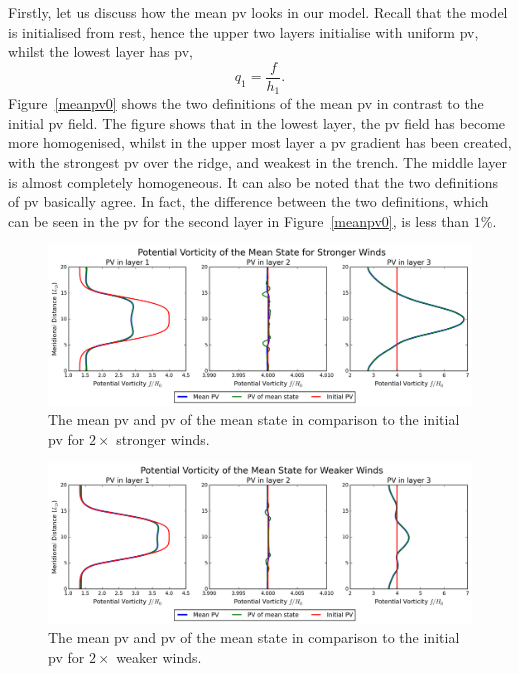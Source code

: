 \documentclass[12pt,a4paper]{report}
\newcommand*\figref[1]{Figure~\ref{#1}}
\begin{document}
 Firstly, let us discuss how the mean \gls{pv} looks in our model. Recall that the model
 is initialised from rest, hence the upper two layers initialise with uniform \gls{pv},
 whilst the lowest layer has \gls{pv},
 \begin{equation*}
 q_{1}=\frac{f}{h_{1}}.
 \end{equation*}
 \figref{meanpv0} shows the two definitions of the mean \gls{pv} in contrast to the initial
 \gls{pv} field. The figure shows that in the lowest layer, the \gls{pv} field has 
 become more homogenised, whilst in the upper most layer a \gls{pv} gradient has been 
 created, with the strongest \gls{pv} over the ridge, and weakest in the trench. The 
 middle layer is almost completely homogeneous. It can also be noted that the two 
 definitions of \gls{pv} basically agree. In fact, the difference between the two
 definitions, which can be seen in the \gls{pv} for the second layer in \figref{meanpv0},
 is less than $1\%$. 
 
 \begin{figure}
 	\centering
 	\includegraphics[width=\linewidth]{meanpv_1}
 	\caption{The mean \gls{pv} and \gls{pv} of the mean state in
 		comparison to the initial \gls{pv} for $2\times$ stronger winds. }
 	\label{meanpv1}
 \end{figure}
 
 \begin{figure}
 	\centering
 	\includegraphics[width=\linewidth]{meanpv_2}
 	\caption{The mean \gls{pv} and \gls{pv} of the mean state in
 		comparison to the initial \gls{pv} for $2\times$ weaker winds. }
 	\label{meanpv2}
 \end{figure}
 
\end{document}
